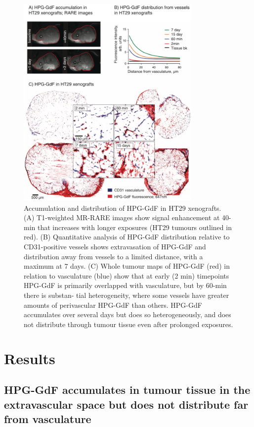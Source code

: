 \begin{figure}[htbp]   
 \begin{center}  
 \includegraphics[width=0.8\textwidth]{hpg/hpg-images/hpg_fig3-hpgdistribution.png}
 \caption{Accumulation and distribution of HPG-GdF in HT29 xenografts. (A) T1-weighted MR-RARE images show signal enhancement at 40-min that increases with longer exposures (HT29 tumours outlined in red). (B) Quantitative analysis of HPG-GdF distribution relative to CD31-positive vessels shows extravasation of HPG-GdF and distribution away from vessels to a limited distance, with a maximum at 7 days. (C) Whole tumour maps of HPG-GdF (red) in relation to vasculature (blue) show that at early (2 min) timepoints HPG-GdF is primarily overlapped with vasculature, but by 60-min there is substan- tial heterogeneity, where some vessels have greater amounts of perivascular HPG-GdF than others. HPG-GdF accumulates over several days but does so heterogeneously, and does not distribute through tumour tissue even after prolonged exposures.}  
 \label{hpgpaper:fig3}  
 \end{center}
\end{figure}

\section{Results}

\subsection{HPG-GdF accumulates in tumour tissue in the extravascular space but does not distribute far from vasculature}

